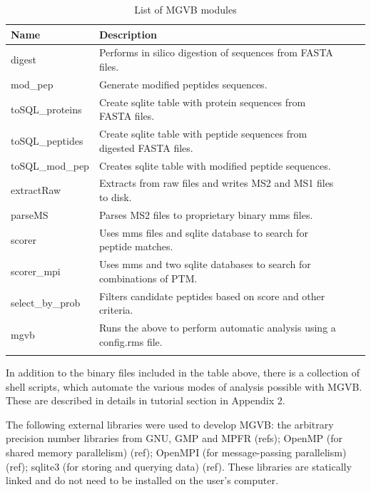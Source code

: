 \documentclass[sn-standardnature]{sn-jnl}%
\theoremstyle{thmstyleone}%
\theoremstyle{thmstyletwo}%
\theoremstyle{thmstylethree}%
\begin{document}
\begin{table}[h]
\begin{center}
\begin{minipage}{350pt}
\caption{List of MGVB modules}
\label{table1}
\begin{tabular}{@{}llll@{}}
\toprule
Name  & Description\\
\midrule
digest & Performs in silico digestion of sequences from FASTA files.\\
mod\_pep & Generate modified peptides sequences.\\
toSQL\_proteins & Create sqlite table with protein sequences from FASTA files.\\
toSQL\_peptides & Create sqlite table with peptide sequences from digested FASTA files.\\
toSQL\_mod\_pep & Creates sqlite table with modified peptide sequences.\\
extractRaw & Extracts from raw files and writes MS2 and MS1 files to disk\footnotemark[1] .   \\
parseMS    & Parses MS2 files to proprietary binary mms files.  \\
scorer    & Uses mms files and sqlite database to search for peptide matches\footnotemark[2].  \\
scorer\_mpi & Uses mms and two sqlite databases to search for combinations of PTM\footnotemark[3]. \\
select\_by\_prob & Filters candidate peptides based on score and other criteria.\\
mgvb & Runs the above to perform automatic analysis using a config.rms file.\\
\botrule
\end{tabular}
\end{minipage}
\end{center}
\end{table}

In addition to the binary files included in the table above, there is a collection of shell scripts, which automate the various modes of analysis possible with MGVB. These are described in details in tutorial section in Appendix 2.

The following external libraries were used to develop MGVB: the arbitrary precision number libraries from GNU, GMP and MPFR (refs); OpenMP (for shared memory parallelism) (ref); OpenMPI (for message-passing parallelism) (ref); sqlite3 (for storing and querying data) (ref). These libraries are statically linked and do not need to be installed on the user's computer.
\end{document}
